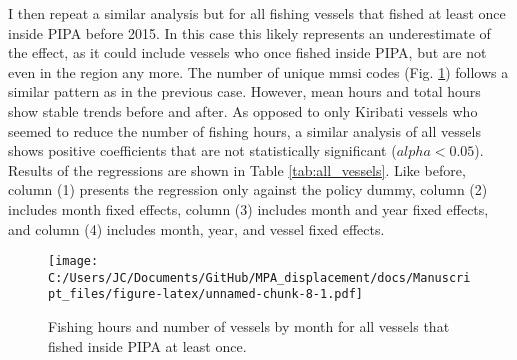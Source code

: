 \documentclass[]{article}
\theoremstyle{definition}
\theoremstyle{definition}
\theoremstyle{definition}
\theoremstyle{remark}
\begin{document}
\clearpage

I then repeat a similar analysis but for all fishing vessels that fished
at least once inside PIPA before 2015. In this case this likely
represents an underestimate of the effect, as it could include vessels
who once fished inside PIPA, but are not even in the region any more.
The number of unique mmsi codes (Fig. \ref{fig:all_vessels}) follows a
similar pattern as in the previous case. However, mean hours and total
hours show stable trends before and after. As opposed to only Kiribati
vessels who seemed to reduce the number of fishing hours, a similar
analysis of all vessels shows positive coefficients that are not
statistically significant (\(alpha < 0.05\)). Results of the regressions
are shown in Table \ref{tab:all_vessels}. Like before, column (1)
presents the regression only against the policy dummy, column (2)
includes month fixed effects, column (3) includes month and year fixed
effects, and column (4) includes month, year, and vessel fixed effects.

\begin{figure}
\centering
\texttt{[image: C:/Users/JC/Documents/GitHub/MPA\_displacement/docs/Manuscript\_files/figure-latex/unnamed-chunk-8-1.pdf]}
\caption{\label{fig:unnamed-chunk-8}\label{fig:all_vessels}Fishing hours and
number of vessels by month for all vessels that fished inside PIPA at
least once.}
\end{figure}
\end{document}
